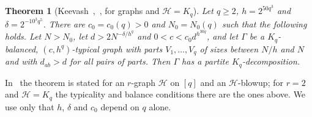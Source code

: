 \documentclass[11pt]{amsart}
\newtheorem{theorem}{Theorem}\newtheorem{lemma}[theorem]{Lemma}
\theoremstyle{definition}\newtheorem{definition}[theorem]{Definition}
\theoremstyle{remark}\newtheorem{remark}[theorem]{Remark}
\begin{document}
\begin{theorem}[{Keevash~\cite[Theorem~2.4]{KeevashCD},~\cite[Theorem~1.7]{KeevashII}, for graphs and $\mathcal H=K_q$}]\label{thm:keevash}
Let $q\ge2$, $h=2^{50q^3}$ and $\delta=2^{-10^3q^5}$. There are $c_0=c_0(q)>0$ and $N_0=N_0(q)$ such that the following
holds. Let $N>N_0$, let $d>2N^{-\delta/h^q}$ and $0<c<c_0d^{h^{30q}}$, and let $\Gamma$ be a $K_q$-balanced,
$(c,h^q)$-typical graph with parts $V_1,\dots,V_q$ of sizes between $N/h$ and $N$ and with $d_{ab}>d$ for all pairs of
parts. Then $\Gamma$ has a partite $K_q$-decomposition.
\end{theorem}

In~\cite{KeevashCD} the theorem is stated for an $r$-graph $\mathcal H$ on $[q]$ and an $\mathcal H$-blowup; for $r=2$ and $\mathcal H=K_q$ the
typicality and balance conditions there are the ones above. We use only that $h$, $\delta$ and $c_0$ depend on $q$
alone.
\end{document}
